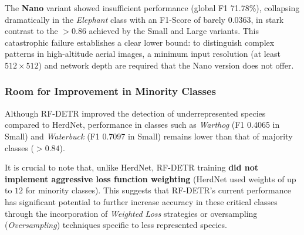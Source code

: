 The \textbf{Nano} variant showed insufficient performance (global F1 71.78\%), collapsing dramatically in the \textit{Elephant} class with an F1-Score of barely 0.0363, in stark contrast to the $>0.86$ achieved by the Small and Large variants. This catastrophic failure establishes a clear lower bound: to distinguish complex patterns in high-altitude aerial images, a minimum input resolution (at least $512 \times 512$) and network depth are required that the Nano version does not offer.

\subsubsection{Room for Improvement in Minority Classes}

Although RF-DETR improved the detection of underrepresented species compared to HerdNet, performance in classes such as \textit{Warthog} (F1 0.4065 in Small) and \textit{Waterbuck} (F1 0.7097 in Small) remains lower than that of majority classes ($>0.84$).

It is crucial to note that, unlike HerdNet, RF-DETR training \textbf{did not implement aggressive loss function weighting} (HerdNet used weights of up to $12$ for minority classes). This suggests that RF-DETR's current performance has significant potential to further increase accuracy in these critical classes through the incorporation of \textit{Weighted Loss} strategies or oversampling (\textit{Oversampling}) techniques specific to less represented species.
